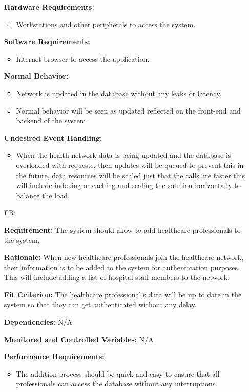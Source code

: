 \documentclass[12pt]{article}
\newcounter{reqnum} %
\begin{document}
\begin{itemize}
\textbf{Hardware Requirements:} 
\begin{itemize}
  \item Workstations and other peripherals to access the system.
\end{itemize}

\textbf{Software Requirements:} 
\begin{itemize}
  \item Internet browser to access the application.
\end{itemize}

\textbf{Normal Behavior:}
\begin{itemize}
  \item Network is updated in the database without any leaks or latency.
  \item Normal behavior will be seen as updated reflected on the front-end and backend of the system.
\end{itemize} 

\textbf{Undesired Event Handling:} 
\begin{itemize}
  \item When the health network data is being updated and the database is overloaded with requests, then updates will be queued to prevent this in the future, data resources will be scaled just that the calls are faster this will include indexing or caching and scaling the solution horizontally to balance the load.
\end{itemize}

\item[FR\refstepcounter{reqnum}\thereqnum \label{FR_AddHealthProfessional}:]

\textbf{Requirement:} The system should allow to add healthcare professionals to the system.

\textbf{Rationale:} When new healthcare professionals join the healthcare network, their information is to be added to the system for authentication purposes. This will include adding a list of hospital staff members to the network.

\textbf{Fit Criterion:} The healthcare professional’s data will be up to date in the system so that they can get authenticated without any delay. 

\textbf{Dependencies:} N/A 

\textbf{Monitored and Controlled Variables:} N/A

\textbf{Performance Requirements:} 
\begin{itemize}
  \item The addition process should be quick and easy to ensure that all professionals can access the database without any interruptions.
\end{itemize}


\end{itemize}
\end{document}
